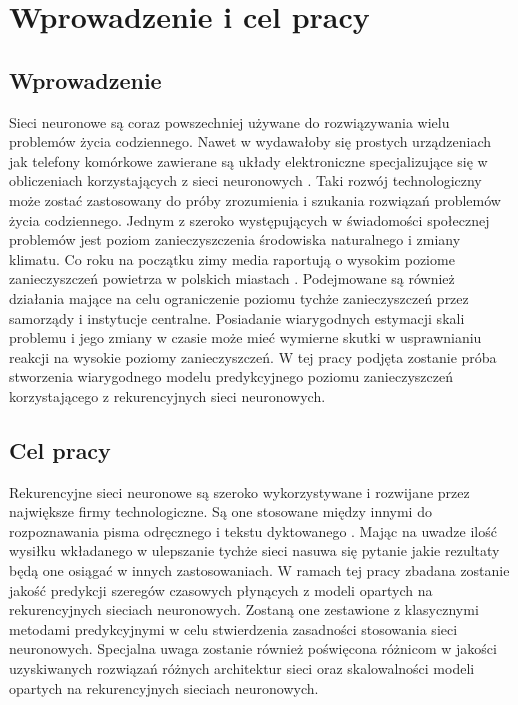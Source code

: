 \documentclass[10pt,a4paper]{article}
\begin{document}
\newpage
{}
\tableofcontents
\newpage

\section{Wprowadzenie i cel pracy}

\subsection{Wprowadzenie}
Sieci neuronowe są coraz powszechniej używane do rozwiązywania wielu problemów życia codziennego. Nawet w wydawałoby się prostych urządzeniach jak telefony komórkowe zawierane są układy elektroniczne specjalizujące się w obliczeniach korzystających z sieci neuronowych \cite{appleNeuralEngine}. Taki rozwój technologiczny może zostać zastosowany do próby zrozumienia i szukania rozwiązań problemów życia codziennego. Jednym z szeroko występujących w świadomości społecznej problemów jest poziom zanieczyszczenia środowiska naturalnego i zmiany klimatu. Co roku na początku zimy media raportują o wysokim poziome zanieczyszczeń powietrza w polskich miastach \cite{airPollutionPoland}. Podejmowane są również działania mające na celu ograniczenie poziomu tychże zanieczyszczeń przez samorządy i instytucje centralne. Posiadanie wiarygodnych estymacji skali problemu i jego zmiany w czasie może mieć wymierne skutki w usprawnianiu reakcji na wysokie poziomy zanieczyszczeń. W tej pracy podjęta zostanie próba stworzenia wiarygodnego modelu predykcyjnego poziomu zanieczyszczeń korzystającego z rekurencyjnych sieci neuronowych.

\subsection{Cel pracy}
Rekurencyjne sieci neuronowe są szeroko wykorzystywane i rozwijane przez największe firmy technologiczne. Są one stosowane między innymi do rozpoznawania pisma odręcznego i tekstu dyktowanego \cite{googleLSTM}. Mając na uwadze ilość wysiłku wkładanego w ulepszanie tychże sieci nasuwa się pytanie jakie rezultaty będą one osiągać w innych zastosowaniach. W ramach tej pracy zbadana zostanie jakość predykcji szeregów czasowych płynących z modeli opartych na rekurencyjnych sieciach neuronowych. Zostaną one zestawione z klasycznymi metodami predykcyjnymi w celu stwierdzenia zasadności stosowania sieci neuronowych. Specjalna uwaga zostanie również poświęcona różnicom w jakości uzyskiwanych rozwiązań różnych architektur sieci oraz skalowalności modeli opartych na rekurencyjnych sieciach neuronowych. 
\end{document}

